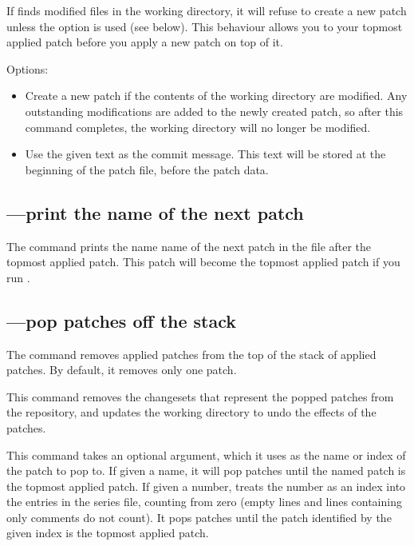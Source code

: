 If  finds modified files in the working directory, it will
refuse to create a new patch unless the  option is
used (see below).  This behaviour allows you to  your
topmost applied patch before you apply a new patch on top of it.

Options:
\begin{itemize}
\item[\hgopt{qnew}{-f}] Create a new patch if the contents of the
  working directory are modified.  Any outstanding modifications are
  added to the newly created patch, so after this command completes,
  the working directory will no longer be modified.
\item[\hgopt{qnew}{-m}] Use the given text as the commit message.
  This text will be stored at the beginning of the patch file, before
  the patch data.
\end{itemize}

\subsection{---print the name of the next patch}

The  command prints the name name of the next patch in
the  file after the topmost applied patch.  This
patch will become the topmost applied patch if you run .

\subsection{---pop patches off the stack}

The  command removes applied patches from the top of the
stack of applied patches.  By default, it removes only one patch.

This command removes the changesets that represent the popped patches
from the repository, and updates the working directory to undo the
effects of the patches.

This command takes an optional argument, which it uses as the name or
index of the patch to pop to.  If given a name, it will pop patches
until the named patch is the topmost applied patch.  If given a
number,  treats the number as an index into the entries in
the series file, counting from zero (empty lines and lines containing
only comments do not count).  It pops patches until the patch
identified by the given index is the topmost applied patch.

